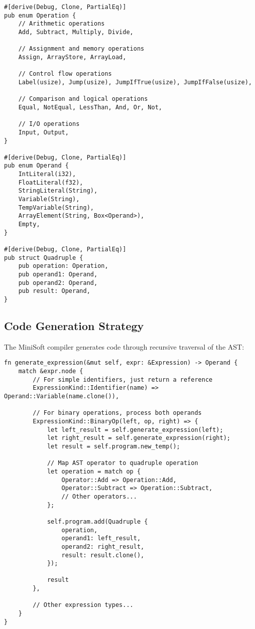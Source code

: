 \documentclass[12pt,a4paper]{article}
\begin{document}
\begin{lstlisting}[caption={Quadruple Structure}]
#[derive(Debug, Clone, PartialEq)]
pub enum Operation {
    // Arithmetic operations
    Add, Subtract, Multiply, Divide,
    
    // Assignment and memory operations
    Assign, ArrayStore, ArrayLoad,
    
    // Control flow operations
    Label(usize), Jump(usize), JumpIfTrue(usize), JumpIfFalse(usize),
    
    // Comparison and logical operations
    Equal, NotEqual, LessThan, And, Or, Not,
    
    // I/O operations
    Input, Output,
}

#[derive(Debug, Clone, PartialEq)]
pub enum Operand {
    IntLiteral(i32),
    FloatLiteral(f32),
    StringLiteral(String),
    Variable(String),
    TempVariable(String),
    ArrayElement(String, Box<Operand>),
    Empty,
}

#[derive(Debug, Clone, PartialEq)]
pub struct Quadruple {
    pub operation: Operation,
    pub operand1: Operand,
    pub operand2: Operand,
    pub result: Operand,
}
\end{lstlisting}

\subsection{Code Generation Strategy}
The MiniSoft compiler generates code through recursive traversal of the AST:

\begin{lstlisting}[caption={Expression Code Generation}]
fn generate_expression(&mut self, expr: &Expression) -> Operand {
    match &expr.node {
        // For simple identifiers, just return a reference
        ExpressionKind::Identifier(name) => Operand::Variable(name.clone()),
        
        // For binary operations, process both operands
        ExpressionKind::BinaryOp(left, op, right) => {
            let left_result = self.generate_expression(left);
            let right_result = self.generate_expression(right);
            let result = self.program.new_temp();

            // Map AST operator to quadruple operation
            let operation = match op {
                Operator::Add => Operation::Add,
                Operator::Subtract => Operation::Subtract,
                // Other operators...
            };

            self.program.add(Quadruple {
                operation,
                operand1: left_result,
                operand2: right_result,
                result: result.clone(),
            });

            result
        },
        
        // Other expression types...
    }
}
\end{lstlisting}
\end{document}
